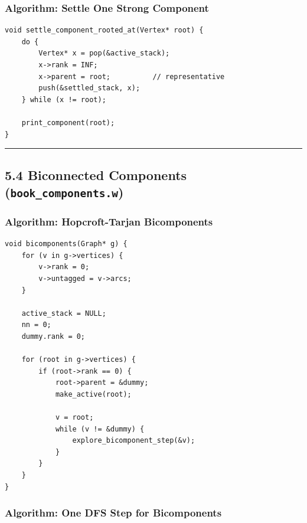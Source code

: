 \documentclass[11pt]{article}
\begin{document}
\subsubsection{Algorithm: Settle One Strong Component}\label{algorithm-settle-one-strong-component}

\begin{verbatim}
void settle_component_rooted_at(Vertex* root) {
    do {
        Vertex* x = pop(&active_stack);
        x->rank = INF;
        x->parent = root;          // representative
        push(&settled_stack, x);
    } while (x != root);

    print_component(root);
}
\end{verbatim}

\begin{center}\rule{0.5\linewidth}{0.5pt}\end{center}

\subsection{\texorpdfstring{5.4 Biconnected Components (\texttt{book\_components.w})}{5.4 Biconnected Components (book\_components.w)}}\label{biconnected-components-book_components.w}

\subsubsection{Algorithm: Hopcroft-Tarjan Bicomponents}\label{algorithm-hopcroft-tarjan-bicomponents}

\begin{verbatim}
void bicomponents(Graph* g) {
    for (v in g->vertices) {
        v->rank = 0;
        v->untagged = v->arcs;
    }

    active_stack = NULL;
    nn = 0;
    dummy.rank = 0;

    for (root in g->vertices) {
        if (root->rank == 0) {
            root->parent = &dummy;
            make_active(root);

            v = root;
            while (v != &dummy) {
                explore_bicomponent_step(&v);
            }
        }
    }
}
\end{verbatim}

\subsubsection{Algorithm: One DFS Step for Bicomponents}\label{algorithm-one-dfs-step-for-bicomponents}
\end{document}
